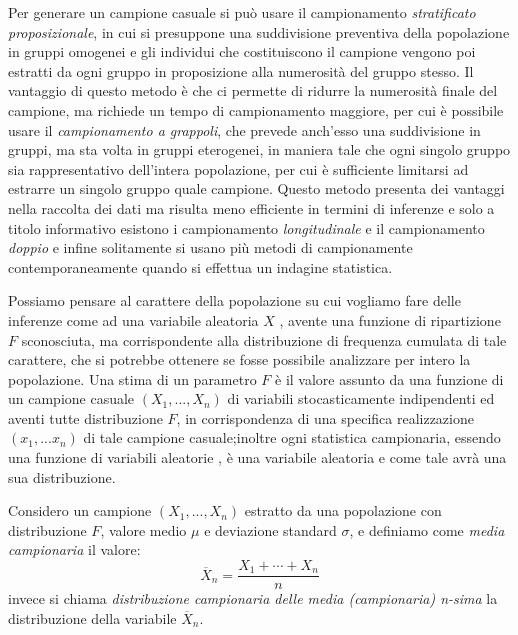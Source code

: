 \documentclass[a4paper,12pt, oneside]{book}
\begin{document}
Per generare un campione casuale si può usare il campionamento \emph{stratificato proposizionale}, in cui si presuppone una
suddivisione preventiva della popolazione in gruppi omogenei e gli individui che costituiscono il campione vengono poi
estratti da ogni gruppo in proposizione alla numerosità del gruppo stesso.\newline
Il vantaggio di questo metodo è che ci permette di ridurre la numerosità finale del campione, ma richiede un tempo
di campionamento maggiore, per cui è possibile usare il \emph{campionamento a grappoli}, che prevede anch'esso una 
suddivisione in gruppi, ma sta volta in gruppi eterogenei, in maniera tale che ogni singolo gruppo sia rappresentativo
dell'intera popolazione, per cui è sufficiente limitarsi ad estrarre un singolo gruppo quale campione.\newline
Questo metodo presenta dei vantaggi nella raccolta dei dati ma risulta meno efficiente in termini di inferenze e solo
a titolo informativo esistono i campionamento \emph{longitudinale} e il campionamento \emph{doppio} e infine solitamente
si usano più metodi di campionamente contemporaneamente quando si effettua un indagine statistica.

Possiamo pensare al carattere della popolazione su cui vogliamo fare delle inferenze come ad una variabile aleatoria $X$ ,
avente una funzione di ripartizione $F$ sconosciuta, ma corrispondente alla distribuzione di frequenza cumulata
di tale carattere, che si potrebbe ottenere se fosse possibile analizzare per intero la popolazione.\newline
Una stima di un parametro $F$ è il valore assunto da una funzione di un campione casuale $(X_1,...,X_n)$ di variabili
stocasticamente indipendenti ed aventi tutte distribuzione $F$, in corrispondenza di una specifica
realizzazione $(x_1,...x_n)$ di tale campione casuale;inoltre ogni statistica campionaria, essendo una funzione di
variabili aleatorie , è una variabile aleatoria e come tale avrà una sua distribuzione.

Considero un campione $(X_1,...,X_n)$ estratto da una popolazione con distribuzione $F$, valore medio $\mu$ 
e deviazione standard $\sigma$, e definiamo come \emph{media campionaria} il valore:
\[ \overline{X} _n = \frac{X_1 + \cdots + X_n}{n} \]
invece si chiama \emph{distribuzione campionaria delle media (campionaria) n-sima} 
la distribuzione della variabile $\overline{X}_n$.
\end{document}

